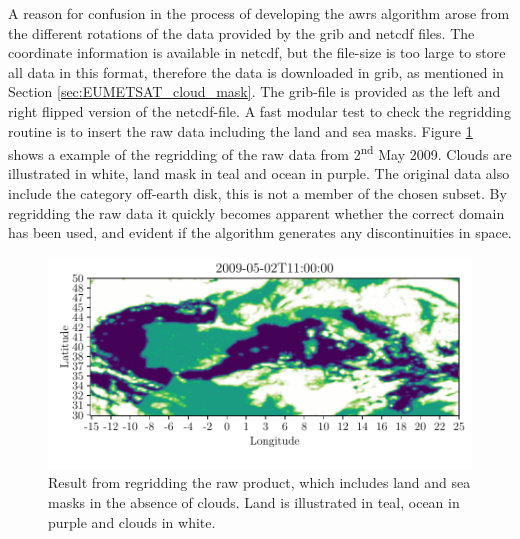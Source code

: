 A reason for confusion in the process of developing the \acrshort{awrs} algorithm arose from the different rotations of the data provided by the \acrshort{grib} and \acrshort{netcdf} files. The coordinate information is available in \acrshort{netcdf}, but the file-size is too large to store all data in this format, therefore the data is downloaded in \acrshort{grib}, as mentioned in Section \ref{sec:EUMETSAT_cloud_mask}. The \acrshort{grib}-file is provided as the left and right flipped version of the  \acrshort{netcdf}-file. A fast modular test to check the regridding routine is to insert the raw data including the land and sea masks. Figure \ref{fig:visual_inspection_regridding} shows a example of the regridding of the raw data from 2\textsuperscript{nd} May 2009. Clouds are illustrated in white, land mask in teal and ocean in purple. The original data also include the category off-earth disk, this is not a member of the chosen subset. By regridding the raw data it quickly becomes apparent whether the correct domain has been used, and evident if the algorithm generates any discontinuities in space. 
\begin{figure}
    \centering
    \includegraphics{python_figs/visual_regridding.pdf}
    \caption{Result from regridding the raw product, which includes land and sea masks in the absence of clouds. Land is illustrated in teal, ocean in purple and clouds in white.}
    \label{fig:visual_inspection_regridding}
\end{figure}

